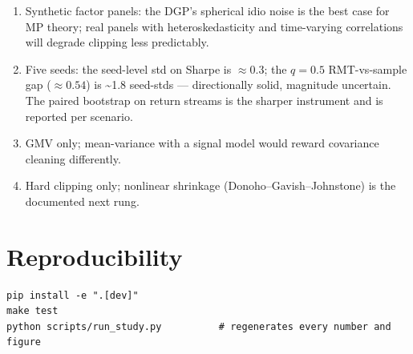 \begin{enumerate}
\def\labelenumi{\arabic{enumi}.}
\tightlist
\item
  Synthetic factor panels: the DGP's spherical idio noise is the best
  case for MP theory; real panels with heteroskedasticity and
  time-varying correlations will degrade clipping less predictably.
\item
  Five seeds: the seed-level std on Sharpe is \(\approx 0.3\); the
  \(q=0.5\) RMT-vs-sample gap (\(\approx 0.54\)) is \textasciitilde1.8
  seed-stds --- directionally solid, magnitude uncertain. The paired
  bootstrap on return streams is the sharper instrument and is reported
  per scenario.
\item
  GMV only; mean-variance with a signal model would reward covariance
  cleaning differently.
\item
  Hard clipping only; nonlinear shrinkage (Donoho--Gavish--Johnstone) is
  the documented next rung.
\end{enumerate}

\section{Reproducibility}\label{reproducibility}

\begin{verbatim}
pip install -e ".[dev]"
make test
python scripts/run_study.py          # regenerates every number and figure
\end{verbatim}
